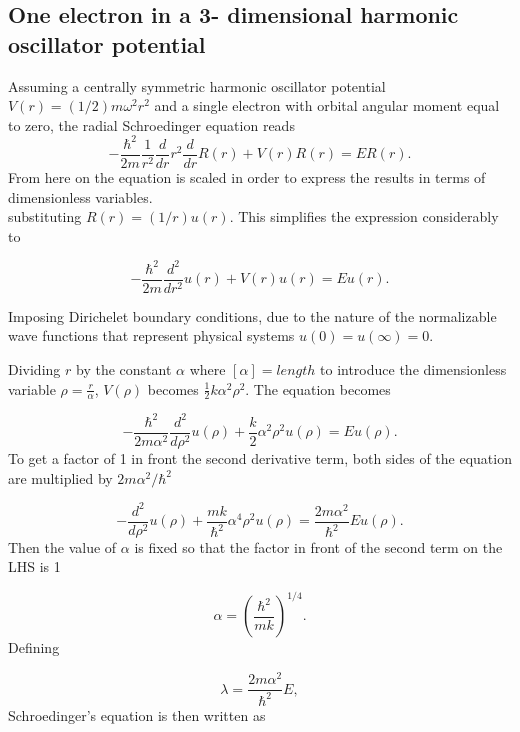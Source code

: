 \documentclass[10pt,a4paper]{article}
\begin{document}
\subsection{One electron in a 3- dimensional harmonic oscillator potential}
Assuming a centrally symmetric harmonic oscillator potential $V(r) = (1/2)m\omega^2r^2$ and a single electron with orbital angular moment equal to zero, the radial Schroedinger equation reads
\begin{equation}
\label{ref. 3}
  -\frac{\hbar^2}{2 m} \frac{1}{r^2} \frac{d}{dr} r^2
  \frac{d}{dr}R(r)+ V(r) R(r) = E R(r).
\end{equation}
From here on the equation is scaled in order to express the results in terms of dimensionless variables.\\
substituting $R(r) = (1/r) u(r)$. This simplifies the expression considerably to

\begin{equation*}
  -\frac{\hbar^2}{2 m} \frac{d^2}{dr^2}u(r)+ V(r) u(r) = E u(r).
\end{equation*}

Imposing Dirichelet boundary conditions, due to the nature of the normalizable wave functions that represent physical systems $u(0)=u(\infty)=0$.

Dividing $r$ by the constant $\alpha$ where $[\alpha] = length$ to introduce the dimensionless variable $\rho =\frac{r}{\alpha}$, $V(\rho)$ becomes $\frac{1}{2}k\alpha^2 \rho^2$. The equation becomes

\begin{equation*}
  -\frac{\hbar^2}{2 m \alpha^2} \frac{d^2}{d\rho^2} u(\rho) 
       + \frac{k}{2} \alpha^2\rho^2u(\rho)  = E u(\rho) .
\end{equation*}
To get a factor of 1 in front the second derivative term, both sides of the equation are multiplied by $2m\alpha^2/\hbar^2$

\begin{equation*}
  -\frac{d^2}{d\rho^2} u(\rho) 
       + \frac{mk}{\hbar^2} \alpha^4\rho^2u(\rho)  = \frac{2m\alpha^2}{\hbar^2}E u(\rho) .
\end{equation*}
Then the value of $\alpha$ is fixed so that the factor in front of the second term on the LHS is 1

\begin{equation*}
\alpha = \left(\frac{\hbar^2}{mk}\right)^{1/4}.
\end{equation*}
Defining

\begin{equation*}
\lambda = \frac{2m\alpha^2}{\hbar^2}E,
\end{equation*}
Schroedinger's equation is then written as
\end{document}
